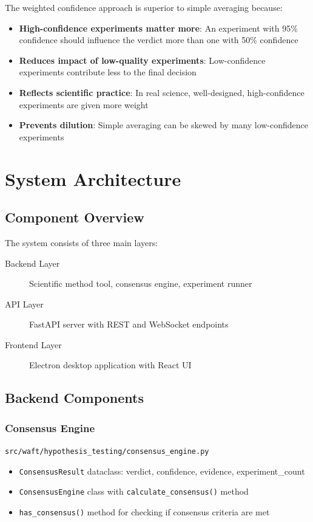 \documentclass{book}
\begin{document}
The weighted confidence approach is superior to simple averaging because:

\begin{itemize}
    \item \textbf{High-confidence experiments matter more}: An experiment with 95\% confidence should influence the verdict more than one with 50\% confidence
    \item \textbf{Reduces impact of low-quality experiments}: Low-confidence experiments contribute less to the final decision
    \item \textbf{Reflects scientific practice}: In real science, well-designed, high-confidence experiments are given more weight
    \item \textbf{Prevents dilution}: Simple averaging can be skewed by many low-confidence experiments
\end{itemize}

\chapter{System Architecture}

\section{Component Overview}

The system consists of three main layers:

\begin{description}
    \item[Backend Layer] Scientific method tool, consensus engine, experiment runner
    \item[API Layer] FastAPI server with REST and WebSocket endpoints
    \item[Frontend Layer] Electron desktop application with React UI
\end{description}

\section{Backend Components}

\subsection{Consensus Engine}

\texttt{src/waft/hypothesis\_testing/consensus\_engine.py}

\begin{itemize}
    \item \texttt{ConsensusResult} dataclass: verdict, confidence, evidence, experiment\_count
    \item \texttt{ConsensusEngine} class with \texttt{calculate\_consensus()} method
    \item \texttt{has\_consensus()} method for checking if consensus criteria are met
\end{itemize}
\end{document}

